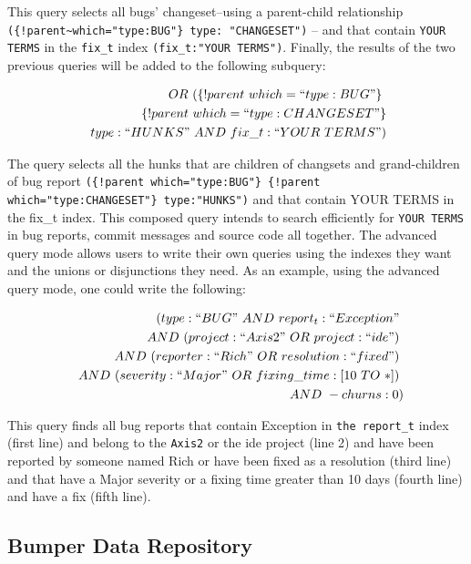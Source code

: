 \documentclass[12pt]{report}
\begin{document}
This query selects all bugs' changeset--using a parent-child
relationship \lstinline&({!parent~which="type:BUG"} type: "CHANGESET")&
-- and that contain \lstinline!YOUR TERMS! in the \lstinline!fix_t!
index \lstinline!(fix_t:"YOUR TERMS")!. Finally, the results of the two
previous queries will be added to the following subquery:

\begin{equation}
\begin{split}
  OR~(\{!parent~which=``type:BUG"\}\ \\
~\{!parent~which=``type:CHANGESET"\}\\
~type:``HUNKS"~AND~fix\_t:``YOUR~TERMS")
\end{split}
\end{equation}

The query selects all the hunks that are children of changsets and
grand-children of bug report
\lstinline&({!parent which="type:BUG"} {!parent which="type:CHANGESET"} type:"HUNKS")&
and that contain YOUR TERMS in the fix\_t index. This composed query
intends to search efficiently for \lstinline!YOUR TERMS! in bug reports,
commit messages and source code all together. The advanced query mode
allows users to write their own queries using the indexes they want and
the unions or disjunctions they need. As an example, using the advanced
query mode, one could write the following:

\begin{equation}
\begin{split}
  (type:``BUG"~AND~report_t:``Exception"~\\
~~AND~(project:``Axis2"~OR~project:``ide")~\\
~~AND~(reporter:``Rich"~OR~resolution:``fixed")~\\
~~AND~(severity:``Major"~OR~fixing\_time:[10~TO~*])~\\
~~AND~-churns:0)
\end{split}
\end{equation}

This query finds all bug reports that contain Exception in
\lstinline!the report_t! index (first line) and belong to the
\lstinline!Axis2! or the ide project (line 2) and have been reported by
someone named Rich or have been fixed as a resolution (third line) and
that have a Major severity or a fixing time greater than 10 days (fourth
line) and have a fix (fifth line).

\subsection{Bumper Data Repository}\label{bumper-data-repository}
\end{document}
